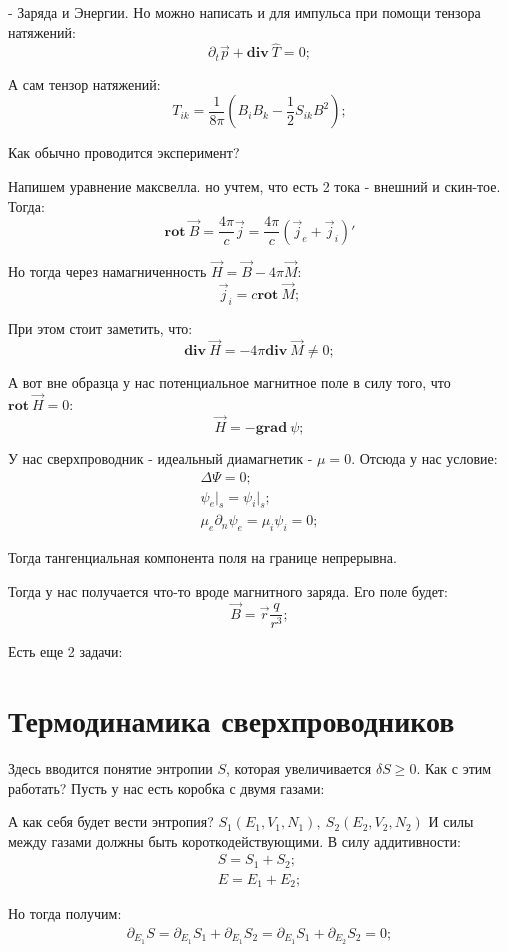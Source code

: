 \documentclass[a4paper, 14pt, russian]{article}
\newcommand{\be}{\begin{equation}}
\newcommand{\ee}{\end{equation}}
\newcommand{\bea}{\begin{eqnarray}}
\newcommand{\eea}{\end{eqnarray}}
\newcommand{\pa}{\partial}
\newcommand{\rot}{\textbf{rot}~}
\renewcommand{\div}{\textbf{div}~}
\renewcommand{\grad}{\textbf{grad}~}
\begin{document}
	- Заряда и Энергии. Но можно написать и для импульса
	при помощи тензора натяжений:
	\be
		\pa_t \vec p + \div \hat T = 0;
	\ee

	А сам тензор натяжений:
	\be
		T_{ik} = \frac{1}{8\pi} (B_i B_k - \frac{1}{2} S_{ik} B^2);
	\ee

	Как обычно проводится эксперимент?

	Напишем уравнение максвелла. но учтем, что есть
	2 тока - внешний и скин-тое. Тогда:
	\be
		\rot \vec B = \frac{4\pi}{c} \vec j = \frac{4\pi}{c}(\vec{j}_e + \vec{j}_i)'
	\ee

	Но тогда через намагниченность $\vec H = \vec B  - 4\pi \vec M$:
	\be
		\vec{j}_i = c \rot \vec M;
	\ee

	При этом стоит заметить, что:
	\be
		\div \vec H = - 4\pi \div \vec M \neq 0;
	\ee

	А вот вне образца у нас потенциальное магнитное поле
	в силу того, что $\rot \vec H  = 0$:
	\be
		\vec H = - \grad \psi;
	\ee


	У нас сверхпроводник - идеальный диамагнетик - $\mu = 0$.
	Отсюда у нас условие:
	\bea
		\Delta \Psi = 0;\\
		\psi_e\rvert_s = \psi_i \rvert_s;\\
		\mu_e \pa_n \psi_e = \mu_i \psi_i = 0;
	\eea

	Тогда тангенциальная компонента поля на границе непрерывна.

	Тогда у нас получается что-то вроде магнитного заряда.
	Его поле будет:
	\be
		\vec B = \vec{r} \frac{q}{r^3};
	\ee

	Есть еще 2 задачи:

	\section{Термодинамика сверхпроводников}
	
	Здесь вводится понятие энтропии $S$, которая
	увеличивается $\delta S \geq 0$. Как с этим работать? 
	Пусть у нас есть коробка с двумя газами:
	
	А как себя будет вести энтропия? 
	$S_1(E_1,V_1,N_1),~S_2(E_2,V_2,N_2)$ И силы между газами
	должны быть короткодействующими. В силу аддитивности:
	\bea
		S = S_1 + S_2;\\
		E = E_1 + E_2;
	\eea

	Но тогда получим:
	\bea
		\pa_{E_1} S = \pa_{E_1} S_1 + \pa_{E_1} S_2 = \pa_{E_1} S_1 + \pa_{E_2} S_2 = 0;
	\eea
\end{document}
